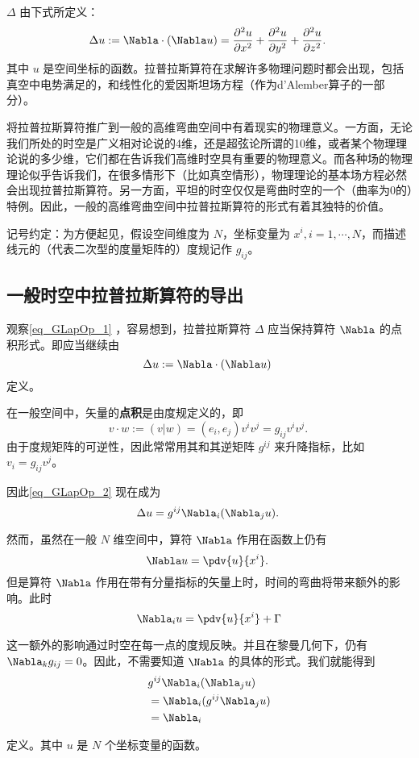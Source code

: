 
 $\Delta$ 由下式所定义：
\begin{equation}\label{eq_GLapOp_1}
\Delta u:=\Nabla\cdot (\Nabla u)=\frac{\partial^{2}{u}}{\partial{x}^{2}} + \frac{\partial^{2}{u}}{\partial{y}^{2}} + \frac{\partial^{2}{u}}{\partial{z}^{2}}.~
\end{equation}
其中 $u$ 是空间坐标的函数。拉普拉斯算符在求解许多物理问题时都会出现，包括真空中电势满足的，和线性化的爱因斯坦场方程（作为d'Alember算子的一部分）。

将拉普拉斯算符推广到一般的高维弯曲空间中有着现实的物理意义。一方面，无论我们所处的时空是广义相对论说的4维，还是超弦论所谓的10维，或者某个物理理论说的多少维，它们都在告诉我们高维时空具有重要的物理意义。而各种场的物理理论似乎告诉我们，在很多情形下（比如真空情形），物理理论的基本场方程必然会出现拉普拉斯算符。另一方面，平坦的时空仅仅是弯曲时空的一个（曲率为0的）特例。因此，一般的高维弯曲空间中拉普拉斯算符的形式有着其独特的价值。

记号约定：为方便起见，假设空间维度为 $N$，坐标变量为 $x^i,i=1,\cdots,N$，而描述线元的（代表二次型的度量矩阵的）度规记作 $g_{ij}$。

\subsection{一般时空中拉普拉斯算符的导出}
观察\autoref{eq_GLapOp_1} ，容易想到，拉普拉斯算符 $\Delta$ 应当保持算符 $\Nabla$ 的点积形式。即应当继续由
\begin{equation}\label{eq_GLapOp_2}
\Delta u:=\Nabla\cdot (\Nabla u)~
\end{equation}
定义。

在一般空间中，矢量的\textbf{点积}是由度规定义的，即
\begin{equation}
v\cdot w:=(v|w)=(e_i,e_j)v^iv^j=g_{ij}v^iv^j.~
\end{equation}
由于度规矩阵的可逆性，因此常常用其和其逆矩阵 $g^{ij}$ 来升降指标，比如 $v_i=g_{ij}v^j$。

因此\autoref{eq_GLapOp_2} 现在成为
\begin{equation}
\Delta u=g^{ij}\Nabla_i(\Nabla_j u).~
\end{equation}

然而，虽然在一般 $N$ 维空间中，算符 $\Nabla$ 作用在函数上仍有
\begin{equation}
\Nabla u=\pdv{u}{x^i}.~
\end{equation}
但是算符 $\Nabla$ 作用在带有分量指标的矢量上时，时间的弯曲将带来额外的影响。此时
\begin{equation}
\Nabla_i u= \pdv{u}{x^i}+\Gamma_{}
\end{equation}

这一额外的影响通过时空在每一点的度规反映。并且在黎曼几何下，仍有 $\Nabla_k g_{ij}=0$。因此，不需要知道 $\Nabla$ 的具体的形式。我们就能得到
\begin{equation}
\begin{aligned}
&g^{ij}\Nabla_i(\Nabla_j u)\\
&=\Nabla_i(g^{ij}\Nabla_j u)\\
&=\Nabla_i
\end{aligned}
\end{equation}


定义。其中 $u$ 是 $N$ 个坐标变量的函数。





